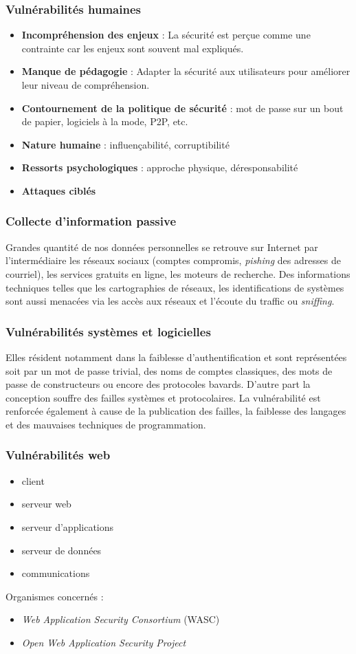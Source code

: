 \documentclass[12pt, a4paper]{article}
\begin{document}
	\subsubsection{Vulnérabilités humaines}
	\begin{itemize}
		\item \textbf{Incompréhension des enjeux} : La sécurité est perçue comme une
		 contrainte car les enjeux sont souvent mal expliqués.
		\item \textbf{Manque de pédagogie} : Adapter la sécurité aux utilisateurs
		pour améliorer leur niveau de compréhension.
		\item \textbf{Contournement de la politique de sécurité} : mot de passe sur
		un bout de papier, logiciels à la mode, P2P, etc.
		\item \textbf{Nature humaine} : influençabilité, corruptibilité
		\item \textbf{Ressorts psychologiques} : approche physique, déresponsabilité
		\item \textbf{Attaques ciblés}
	\end{itemize}
	\subsubsection{Collecte d'information passive}
	Grandes quantité de nos données personnelles se retrouve sur Internet par
	l'intermédiaire les réseaux sociaux (comptes compromis, \textit{pishing} des
	adresses de courriel), les services gratuits en ligne, les moteurs de
	recherche. Des informations techniques telles que les cartographies de
	réseaux, les identifications de systèmes sont aussi menacées via les accès aux
	 réseaux et l'écoute du traffic ou \textit{sniffing}.
	\subsubsection{Vulnérabilités systèmes et logicielles}
	Elles résident notamment dans la faiblesse d'authentification et sont
	représentées soit par un mot de passe trivial, des noms de comptes classiques,
	 des mots de passe de constructeurs ou encore des protocoles bavards. D'autre
	part la conception souffre des failles systèmes et protocolaires. La
	vulnérabilité est renforcée également à cause de la publication des failles,
	la faiblesse des langages et des mauvaises techniques de programmation.
	\subsubsection{Vulnérabilités web}
	\begin{itemize}
		\item client
		\item serveur web
		\item serveur d'applications
		\item serveur de données
		\item communications
	\end{itemize}
	Organismes concernés :
	\begin{itemize}
		\item \textit{Web Application Security Consortium} (WASC)
		\item \textit{Open Web Application Security Project}
	\end{itemize}
\end{document}
